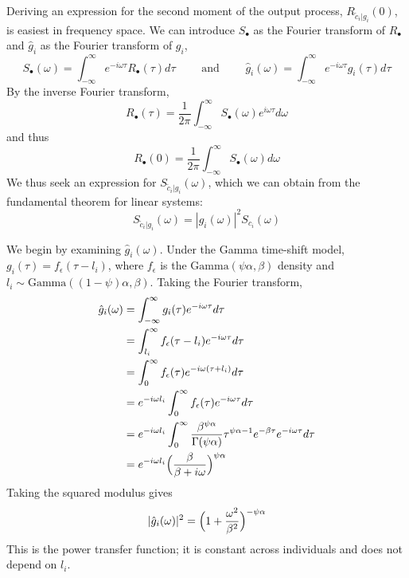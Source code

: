 Deriving an expression for the second moment of the output process, $R_{\tilde{c}_i | g_i}(0)$, is easiest in frequency space. We can introduce $S_\bullet$ as the Fourier transform of $R_\bullet$ and $\hat{g}_i$ as the Fourier transform of $g_i$, \ie 
\begin{equation}
S_\bullet(\omega) = \int_{-\infty}^{\infty} e^{-i \omega \tau} R_\bullet(\tau) d\tau 
\qquad \text{ and } \qquad 
\hat{g}_i(\omega) = \int_{-\infty}^{\infty} e^{-i \omega \tau} g_i(\tau) d\tau
\end{equation}
By the inverse Fourier transform, 
\begin{equation}
R_\bullet(\tau) = \frac{1}{2\pi} \int_{-\infty}^{\infty} S_\bullet(\omega) e^{i \omega \tau} d\omega
\end{equation}
and thus 
\begin{equation}
R_\bullet(0) = \frac{1}{2\pi} \int_{-\infty}^{\infty} S_\bullet(\omega) d\omega
\end{equation}
We thus seek an expression for $S_{\tilde{c}_i | g_i}(\omega)$, which we can obtain from the fundamental theorem for linear systems: 
\begin{equation}
	S_{\tilde{c}_i | g_i}(\omega) = |\hat{g}_i(\omega)|^2 S_{c_i}(\omega)
\end{equation}

 We begin by examining $\hat{g}_i(\omega)$. Under the Gamma time-shift model, $g_i(\tau) = f_\epsilon(\tau - l_i)$, where $f_\epsilon$ is the $\text{Gamma}(\psi \alpha, \beta)$ density and $l_i \sim \text{Gamma}((1-\psi) \alpha, \beta)$. Taking the Fourier transform, 
\begin{align}
	\hat{g}_i(\omega) &= \int_{-\infty}^{\infty} g_i(\tau) e^{-i \omega \tau} d\tau \\ 
	&=	\int_{l_i}^{\infty} f_\epsilon(\tau - l_i) e^{-i \omega \tau}  d\tau\\ 
	&= \int_0^\infty f_\epsilon(\tau) e^{-i \omega (\tau + l_i)} d\tau \\
	&=  e^{-i \omega l_i} \int_0^\infty f_\epsilon(\tau) e^{-i \omega \tau} d\tau \\ 
	&= e^{-i \omega l_i} \int_0^\infty \frac{\beta^{\psi \alpha}}{\Gamma(\psi \alpha)} \tau^{\psi \alpha - 1} e^{-\beta \tau} e^{-i\omega\tau} d\tau \\
&= e^{-i \omega l_i} \Bigl(  \frac{\beta}{\beta + i \omega}\Bigr)^{\psi \alpha}
\end{align}
Taking the squared modulus gives 
\begin{equation}
 |\hat{g}_i(\omega)|^2 = \Bigl(1 + \frac{\omega^2}{\beta^2}\Bigr)^{-\psi \alpha}
\end{equation}
This is the power transfer function; it is constant across individuals and does not depend on $l_i$. 

